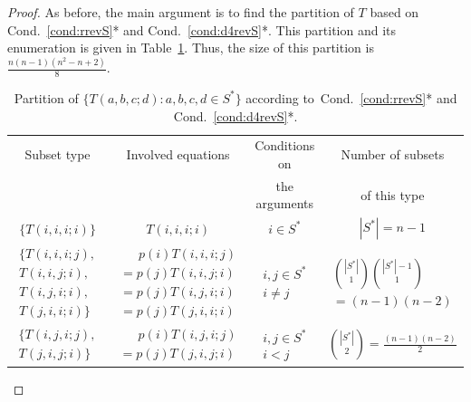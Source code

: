 \documentclass[AHL,Unicode,longabstracts]{cedram}
\newcounter{a}
\newcommand{\Cond}{Cond.}
\begin{document}
\begin{proof}
As before, the main argument is to find the partition of $T$ based on \Cond~\ref{cond:rrevS}* and \Cond~\ref{cond:d4revS}*. This partition and its enumeration is given in Table~\ref{table:part11}. Thus, the size of this partition is $ \frac{n (n-1) (n^2-n+2)}{8}$.


\begin{table}[!ht]
\renewcommand{\arraystretch}{1.25}
\caption{Partition of $\{T(a,b,c;d) : a,b,c,d \in S^*\}$ according to~\Cond~\ref{cond:rrevS}* and \Cond~\ref{cond:d4revS}*.} \label{table:part11}
{\footnotesize
\begin{tabular}{|c|c|c|c|}
\hline Subset type & Involved equations & Conditions on & Number of subsets \\
& & the arguments & of this type \\
\hline $\{T(i,i,i;i)\}$ & $T(i,i,i;i)$ & $i\in S^*$ & $|S^*|=n-1$ \\
\hline $
\begin{matrix} \{T(i,i,i;j), \\ T(i,i,j;i), \\ T(i,j,i;i),\\ T(j,i,i;i)\}
\end{matrix}$ & $
\begin{matrix} \phantom{=}\, p(i) T(i,i,i;j) \\ = p(j) T(i,i,j;i) \\ = p(j) T(i,j,i;i) \\ = p(j) T(j,i,i;i)
\end{matrix}$ & $
\begin{matrix} i,j \in S^* \\ i \neq j
\end{matrix}$ & $
\begin{matrix} \displaystyle \binom{|S^*|}{1} \binom{|S^*|-1}{1} \\ \displaystyle = (n-1) (n-2)
\end{matrix}$ \\
\hline $
\begin{matrix} \{T(i,j,i;j),\\ T(j,i,j;i)\}
\end{matrix}$ & $
\begin{matrix} \phantom{=}\, p(i) T(i,j,i;j) \\ = p(j) T(j,i,j;i)
\end{matrix}$ & $
\begin{matrix} i,j \in S^* \\ i < j
\end{matrix}$ & $\displaystyle \binom{|S^*|}{2} = \frac{(n-1)(n-2)}{2}$ \\

\end{tabular}}
\end{table}
\end{proof}
\end{document}
